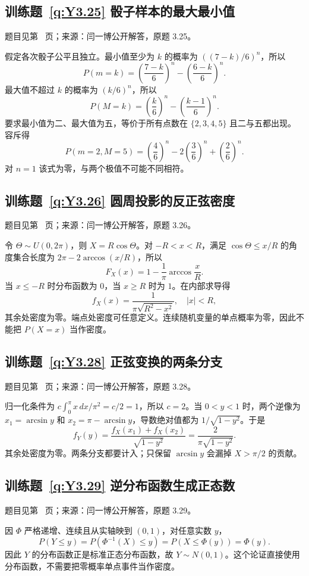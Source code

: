 \documentclass[UTF8,12pt,a4paper,fontset=fandol]{ctexbook}
\begin{document}
\subsection*{训练题~\ref{q:Y3.25} 骰子样本的最大最小值}\label{a:Y3.25}{\small 题目见第~\pageref{q:Y3.25} 页；来源：闫一博公开解答，原题 3.25。}
\begin{solve}假定各次骰子公平且独立。最小值至少为 $k$ 的概率为 $((7-k)/6)^n$，所以\[P(m=k)=\left(\frac{7-k}{6}\right)^n-\left(\frac{6-k}{6}\right)^n.\]最大值不超过 $k$ 的概率为 $(k/6)^n$，所以\[P(M=k)=\left(\frac{k}{6}\right)^n-\left(\frac{k-1}{6}\right)^n.\]要求最小值为二、最大值为五，等价于所有点数在 $\{2,3,4,5\}$ 且二与五都出现。容斥得\[P(m=2,M=5)=\left(\frac46\right)^n-2\left(\frac36\right)^n+\left(\frac26\right)^n.\]对 $n=1$ 该式为零，与两个极值不可能不同相符。\end{solve}

\subsection*{训练题~\ref{q:Y3.26} 圆周投影的反正弦密度}\label{a:Y3.26}{\small 题目见第~\pageref{q:Y3.26} 页；来源：闫一博公开解答，原题 3.26。}
\begin{solve}令 $\Theta\sim U(0,2\pi)$，则 $X=R\cos\Theta$。对 $-R<x<R$，满足 $\cos\Theta\le x/R$ 的角度集合长度为 $2\pi-2\arccos(x/R)$，所以\[F_X(x)=1-\frac{1}{\pi}\arccos\frac{x}{R}.\]当 $x\le-R$ 时分布函数为 $0$，当 $x\ge R$ 时为 $1$。在内部求导得\[f_X(x)=\frac{1}{\pi\sqrt{R^2-x^2}},\quad |x|<R,\]其余处密度为零。端点处密度可任意定义。连续随机变量的单点概率为零，因此不能把 $P(X=x)$ 当作密度。\end{solve}

\subsection*{训练题~\ref{q:Y3.28} 正弦变换的两条分支}\label{a:Y3.28}{\small 题目见第~\pageref{q:Y3.28} 页；来源：闫一博公开解答，原题 3.28。}
\begin{solve}归一化条件为 $c\int_0^\pi x\,dx/\pi^2=c/2=1$，所以 $c=2$。当 $0<y<1$ 时，两个逆像为 $x_1=\arcsin y$ 和 $x_2=\pi-\arcsin y$，导数绝对值都为 $1/\sqrt{1-y^2}$。于是\[f_Y(y)=\frac{f_X(x_1)+f_X(x_2)}{\sqrt{1-y^2}}=\frac{2}{\pi\sqrt{1-y^2}}.\]其余处密度为零。两条分支都要计入；只保留 $\arcsin y$ 会漏掉 $X>\pi/2$ 的贡献。\end{solve}

\subsection*{训练题~\ref{q:Y3.29} 逆分布函数生成正态数}\label{a:Y3.29}{\small 题目见第~\pageref{q:Y3.29} 页；来源：闫一博公开解答，原题 3.29。}
\begin{solve}因 $\Phi$ 严格递增、连续且从实轴映到 $(0,1)$，对任意实数 $y$，\[P(Y\le y)=P(\Phi^{-1}(X)\le y)=P(X\le\Phi(y))=\Phi(y).\]因此 $Y$ 的分布函数正是标准正态分布函数，故 $Y\sim N(0,1)$。这个论证直接使用分布函数，不需要把零概率单点事件当作密度。\end{solve}
\end{document}
